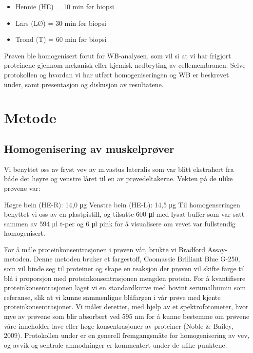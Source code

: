 \documentclass[
  letterpaper,
  DIV=11,
  numbers=noendperiod]{scrreprt}
\providecommand{\tightlist}{%
  \setlength{\itemsep}{0pt}\setlength{\parskip}{0pt}}\usepackage{longtable,booktabs,array}
\begin{document}
\begin{itemize}
\tightlist
\item
  Hennie (HE) = 10 min før biopsi
\item
  Lars (LØ) = 30 min før biopsi
\item
  Trond (T) = 60 min før biopsi
\end{itemize}

Prøven ble homogenisert forut for WB-analysen, som vil si at vi har
frigjort proteinene gjennom mekanisk eller kjemisk nedbryting av
cellemembranen. Selve protokollen og hvordan vi har utført
homogeniseringen og WB er beskrevet under, samt presentasjon og
diskusjon av resultatene.

\section{Metode}\label{metode-5}

\subsection{Homogenisering av
muskelprøver}\label{homogenisering-av-muskelpruxf8ver}

Vi benyttet oss av fryst vev av m.vastus lateralis som var blitt
ekstrahert fra både det høyre og venstre låret til en av
prøvedeltakerne. Vekten på de ulike prøvene var:

Høgre bein (HE-R): 14,0 μg Venstre bein (HE-L): 14,5 μg Til
homogenseringen benyttet vi oss av en plastpistill, og tilsatte 600 μl
med lysat-buffer som var satt sammen av 594 μl t-per og 6 μl pink for å
visualisere om vevet var fullstendig homogenisert.

For å måle proteinkonsentrasjonen i prøven vår, brukte vi Bradford
Assay-metoden. Denne metoden bruker et fargestoff, Coomassie Brilliant
Blue G-250, som vil binde seg til proteiner og skape en reaksjon der
prøven vil skifte farge til blå i proporsjon med proteinkonsentrasjonen
mengden protein. For å kvantifisere proteinkonsentrasjonen laget vi en
standardkurve med bovint serumalbumin som referanse, slik at vi kunne
sammenligne blåfargen i vår prøve med kjente proteinkonsentrasjoner. Vi
måler deretter, med hjelp av et spektrofotometer, hvor mye av prøvene
som blir absorbert ved 595 nm for å kunne bestemme om prøvene våre
inneholder lave eller høge konsentrasjoner av proteiner (Noble \&
Bailey, 2009). Protokollen under er en generell fremgangsmåte for
homogenisering av vev, og avvik og sentrale anmodninger er kommentert
under de ulike punktene.
\end{document}
